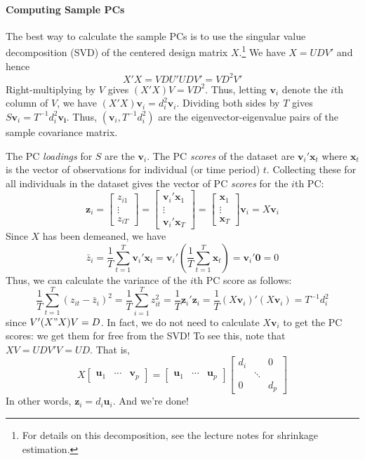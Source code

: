 \documentclass[12pt]{article}
\theoremstyle{definition}
\begin{document}
\paragraph{Computing Sample PCs} 
The best way to calculate the sample PCs is to use the singular value decomposition (SVD) of the centered design matrix $X$.\footnote{For details on this decomposition, see the lecture notes for shrinkage estimation.} We have $X = UDV'$ and hence 
$$X'X = VDU'UDV' = VD^2V'$$
Right-multiplying by $V$ gives $(X'X)V = VD^2$. Thus, letting $\mathbf{v}_i$ denote the $i$th column of $V$, we have $(X'X)\mathbf{v}_i = d_i^2 \mathbf{v}_i$. Dividing both sides by $T$ gives $S \mathbf{v}_i = T^{-1}d_i^2\mathbf{v_i}$. Thus, $(\mathbf{v}_i, T^{-1}d_i^2)$ are the eigenvector-eigenvalue pairs of the sample covariance matrix. 

The PC \emph{loadings} for $S$ are the $\mathbf{v}_i$. The PC \emph{scores} of the dataset are $\mathbf{v}_i' \mathbf{x}_t$ where $\mathbf{x}_t$ is the vector of observations for individual (or time period) $t$. Collecting these for all individuals in the dataset gives the vector of PC \emph{scores} for the $i$th PC:
 $$\textbf{z}_i = \left[ \begin{array}
 	{cc} z_{i1} \\ \vdots \\ z_{iT}
 \end{array}\right] =\left[\begin{array}
 	{cc} \textbf{v}_i' \textbf{x}_1 \\ \vdots \\ \textbf{v}_i' \textbf{x}_T  
 \end{array} \right] = \left[\begin{array}
 	{cc}  \textbf{x}_1 \\ \vdots \\  \textbf{x}_T  
 \end{array} \right]\textbf{v}_i = X \textbf{v}_i$$
Since $X$ has been demeaned, we have
	$$\bar{z}_i = \frac{1}{T} \sum_{t=1}^T\textbf{v}_i' \textbf{x}_t =\textbf{v}_i' \left( \frac{1}{T} \sum_{t=1}^T \textbf{x}_t\right) = \textbf{v}_i' \textbf{0} = 0$$
Thus, we can calculate the variance of the $i$th PC score as follows:
	$$\frac{1}{T}\sum_{t=1}^T (z_{it} - \bar{z}_i)^2 = \frac{1}{T}\sum_{i=1}^T z_{it}^2 = \frac{1}{T} \textbf{z}_i' \textbf{z}_i = \frac{1}{T} (X \textbf{v}_i)'(X \textbf{v}_i) = T^{-1}d_i^2$$
since $V'(X"X)V = D$. In fact, we do not need to calculate $X \mathbf{v}_i$ to get the PC scores: we get them for free from the SVD! To see this, note that $XV = UDV'V = UD$. That is,
	$$X\left[ \begin{array}
		{ccc} \textbf{u}_1 & \cdots & \textbf{v}_p
	\end{array}\right]= \left[ \begin{array}
		{ccc} \textbf{u}_1 & \cdots & \textbf{u}_p
	\end{array}\right] \left[\begin{array}
		{ccc} d_i & &0 \\
		& \ddots &\\
		0& & d_p
	\end{array} \right]$$
In other words, $\mathbf{z}_i = d_i \mathbf{u}_i$. And we're done!
\end{document}
